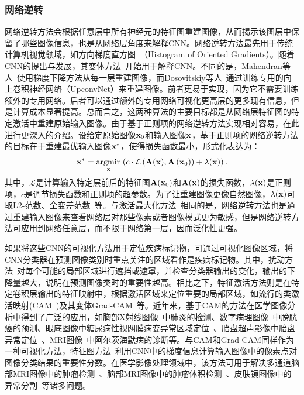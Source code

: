 \subsubsection*{网络逆转}
网络逆转方法会根据任意层中所有神经元的特征图重建图像，从而揭示该图层中保留了哪些图像信息，也是从网络层角度来解释CNN。网络逆转方法最先用于传统计算机视觉领域，如方向梯度直方图~\cite{dalal2005histograms}（Histogram of Oriented Gradients）。随着CNN的提出与发展，其变体方法~\cite{mahendran2015understanding, mahendran2016visualizing, dosovitskiy2016inverting}开始用于解释CNN。不同的是，Mahendran等人~\cite{mahendran2015understanding, mahendran2016visualizing}使用梯度下降方法从每一层重建图像，而Dosovitskiy等人~\cite{dosovitskiy2016inverting}通过训练专用的向上卷积神经网络（UpconvNet）来重建图像。前者更易于实现，因为它不需要训练额外的专用网络。后者可以通过额外的专用网络可视化更高层的更多现有信息，但是计算成本显著提高。总而言之，这两种算法的主要目标都是从网络层特征图的特定激活中重建原始输入图像。由于基于正则项的网络逆转方法实现相对容易，在此进行更深入的介绍。设给定原始图像$\mathbf{x}_0$和输入图像$\mathbf{x}$，基于正则项的网络逆转方法的目标在于重建最优输入图像$\mathbf{x}^*$，使得损失函数最小，形式化表达为：
\begin{equation}
\mathbf{x}^{*}=\underset{\mathbf{x}}{\operatorname{argmin}}\left(c \cdot \mathcal{L}\left(\mathbf{A}(\mathbf{x}), \mathbf{A}\left(\mathbf{x}_{0}\right)\right)+\lambda(\mathbf{x})\right).
\end{equation}
其中，$\mathcal{L}$是计算输入特定层前后的特征图$\mathbf{A}(\mathbf{x}_0)$和$\mathbf{A}(\mathbf{x})$的损失函数，$\lambda(\mathbf{x})$是正则项，$c$是调节损失函数和正则项的超参数。为了让重建图像更像自然图像，$\lambda(\mathbf{x})$可取L2-范数、全变差范数~\cite{rudin1992nonlinear}等。与激活最大化方法~\cite{simonyan2013deep}相同的是，网络逆转方法也是通过重建输入图像来查看网络层对那些像素或者图像模式更为敏感，但是网络逆转方法可应用到网络任意层，而不限于网络第一层，因而泛化性更强。

如果将这些CNN的可视化方法用于定位疾病标记物，可通过可视化图像区域，将CNN分类器在预测图像类别时重点关注的区域看作是疾病标记物。其中，扰动方法~\cite{zintgraf2017visualizing}对每个可能的局部区域进行遮挡或遮罩，并检查分类器输出的变化，输出的下降量越大，说明在预测图像类时的重要性越高。相比之下，特征激活方法则是在特定卷积层输出的特征映射中，根据激活区域来定位重要的局部区域，如流行的类激活映射(CAM~\cite{zhou2016learning})及其变体Grad-CAM~\cite{selvaraju2017grad}等。近年来，基于CAM的方法在医学图像分析中得到了广泛的应用，如胸部X射线图像~\cite{rajpurkar2017chexnet}中肺炎的检测、数字病理图像~\cite{zhang2017mdnet}中膀胱癌的预测、眼底图像中糖尿病性视网膜病变异常区域定位~\cite{Gondaletal17}、胎盘超声影像中胎盘异常定位~\cite{Qi2017WeaklySL}、MRI图像~\cite{yang2018visual}中阿尔茨海默病的诊断等。与CAM和Grad-CAM同样作为一种可视化方法，特征图方法~\cite{simonyan2013deep}利用CNN中的梯度信息计算输入图像中的像素点对图像分类结果的重要性分数。在医学影像处理领域中，该方法可用于解决多通道脑部MRI图像中的肿瘤检测~\cite{banerjee2016novel}、脑部MRI图像中的肿瘤体积检测~\cite{mitra2017volumetric}、皮肤镜图像中的异常分割~\cite{jahanifar2018supervised}等诸多问题。

